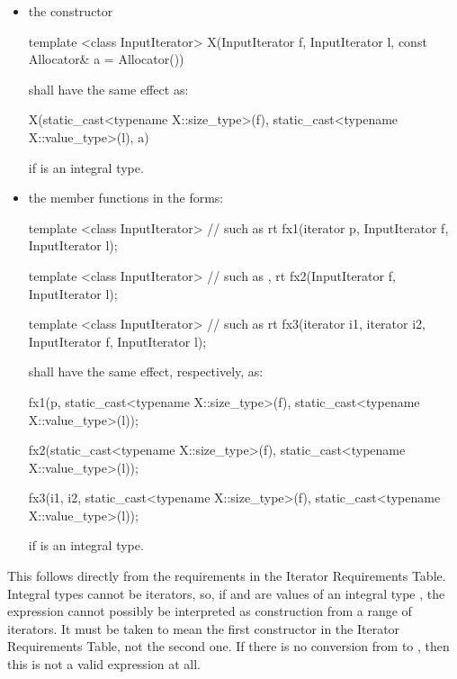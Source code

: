 \begin{itemize}
\item the constructor

\begin{codeblock}
template <class InputIterator>
X(InputIterator f, InputIterator l, const Allocator& a = Allocator())
\end{codeblock}

shall have the same effect as:

\begin{codeblock}
X(static_cast<typename X::size_type>(f),
  static_cast<typename X::value_type>(l),
  a)
\end{codeblock}

if  is an integral type.

\item the member functions in the forms:

\begin{codeblock}
template <class InputIterator>          // such as 
rt fx1(iterator p, InputIterator f, InputIterator l);

template <class InputIterator>          // such as , 
rt fx2(InputIterator f, InputIterator l);

template <class InputIterator>          // such as 
rt fx3(iterator i1, iterator i2, InputIterator f, InputIterator l);
\end{codeblock}

shall have the same effect, respectively, as:

\begin{codeblock}
fx1(p,
    static_cast<typename X::size_type>(f),
    static_cast<typename X::value_type>(l));

fx2(static_cast<typename X::size_type>(f),
    static_cast<typename X::value_type>(l));

fx3(i1, i2,
    static_cast<typename X::size_type>(f),
    static_cast<typename X::value_type>(l));
\end{codeblock}

if  is an integral type.
\end{itemize}

\pnum
\enternote
This follows directly from the requirements in the Iterator Requirements Table.
Integral types cannot be iterators, so, if  and  are values
of an integral type , the expression  cannot possibly
be interpreted as construction from a range of iterators. It must be taken to
mean the first constructor in the Iterator Requirements Table, not the second
one. If there is no conversion from  to , then
this is not a valid expression at all.

